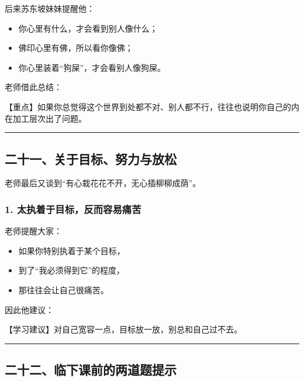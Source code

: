 \documentclass[
  chinese,
  9pt,
  a4paper,
]{ctexart}
\providecommand{\tightlist}{%
  \setlength{\itemsep}{0pt}\setlength{\parskip}{0pt}}
\begin{document}
后来苏东坡妹妹提醒他：

\begin{itemize}
\tightlist
\item
  你心里有什么，才会看到别人像什么；
\item
  佛印心里有佛，所以看你像佛；
\item
  你心里装着``狗屎''，才会看别人像狗屎。
\end{itemize}

老师借此总结：

【重点】如果你总觉得这个世界到处都不对、别人都不行，往往也说明你自己的内在加工层次出了问题。

\begin{center}\rule{0.5\linewidth}{0.5pt}\end{center}

\subsection{二十一、关于目标、努力与放松}\label{ux4e8cux5341ux4e00ux5173ux4e8eux76eeux6807ux52aaux529bux4e0eux653eux677e}

老师最后又谈到``有心栽花花不开，无心插柳柳成荫''。

\subsubsection{1.
太执着于目标，反而容易痛苦}\label{ux592aux6267ux7740ux4e8eux76eeux6807ux53cdux800cux5bb9ux6613ux75dbux82e6}

老师提醒大家：

\begin{itemize}
\tightlist
\item
  如果你特别执着于某个目标，
\item
  到了``我必须得到它''的程度，
\item
  那往往会让自己很痛苦。
\end{itemize}

因此他建议：

【学习建议】对自己宽容一点，目标放一放，别总和自己过不去。

\begin{center}\rule{0.5\linewidth}{0.5pt}\end{center}

\subsection{二十二、临下课前的两道题提示}\label{ux4e8cux5341ux4e8cux4e34ux4e0bux8bfeux524dux7684ux4e24ux9053ux9898ux63d0ux793a}
\end{document}
